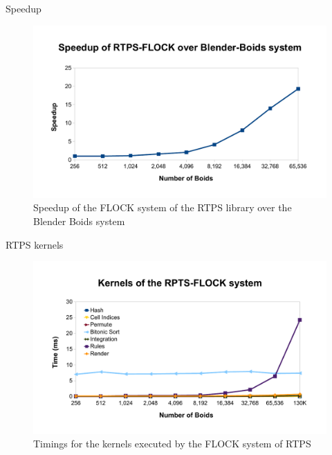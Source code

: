 \documentclass[red]{beamer}
\begin{document}

\begin{frame}{Speedup} 
	\begin{figure}[htbp]
	\begin{center}
	\includegraphics[scale=0.30]{../figures/speedup.pdf}
	\caption{Speedup of the FLOCK system of the RTPS library over the Blender Boids system}
	\label{speedup}
	\end{center}
	\end{figure}
\end{frame}

\begin{frame}{RTPS kernels}
	\begin{figure}[htbp]
	\begin{center}
	\includegraphics[scale=0.30]{../figures/kernelsPlot.pdf}
	\caption{Timings for the kernels executed by the FLOCK system of RTPS}
	\label{kernelBench}
	\end{center}
	\end{figure}
\end{frame}
\end{document}
